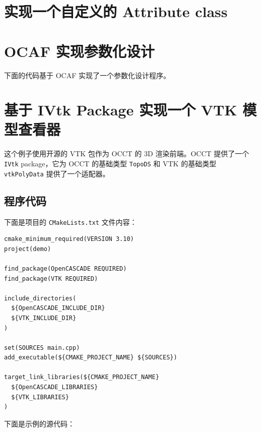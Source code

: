 \documentclass[11pt]{article}
\let\oldsection\section
\renewcommand{\section}{\clearpage\oldsection}
\begin{document}
\section{实现一个自定义的 Attribute class}
\label{sec:orge6a79b7}




\section{OCAF 实现参数化设计}
\label{sec:org4ac97ba}

下面的代码基于 OCAF 实现了一个参数化设计程序。
\section{基于 IVtk Package 实现一个 VTK 模型查看器}
\label{sec:org336490d}

这个例子使用开源的 VTK 包作为 OCCT 的 3D 渲染前端。OCCT 提供了一个 \texttt{IVtk} package，它为 OCCT 的基础类型 \texttt{TopoDS} 和 VTK 的基础类型 \texttt{vtkPolyData} 提供了一个适配器。
\subsection{程序代码}
\label{sec:orgd64cc7f}

下面是项目的 \texttt{CMakeLists.txt} 文件内容：

\begin{verbatim}
cmake_minimum_required(VERSION 3.10)
project(demo)

find_package(OpenCASCADE REQUIRED)
find_package(VTK REQUIRED)

include_directories(
  ${OpenCASCADE_INCLUDE_DIR}
  ${VTK_INCLUDE_DIR}
)

set(SOURCES main.cpp)
add_executable(${CMAKE_PROJECT_NAME} ${SOURCES})

target_link_libraries(${CMAKE_PROJECT_NAME}
  ${OpenCASCADE_LIBRARIES}
  ${VTK_LIBRARIES}
)
\end{verbatim}

下面是示例的源代码：
\end{document}
